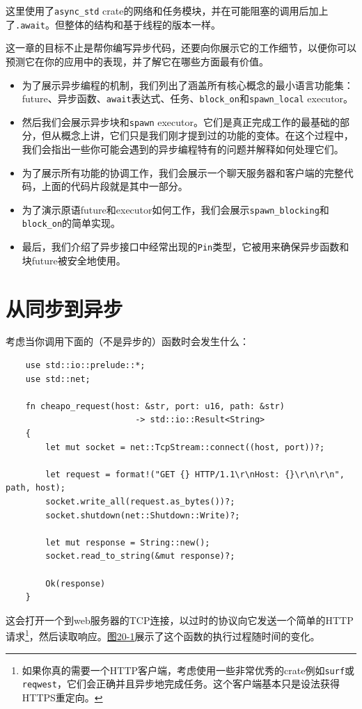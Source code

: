 这里使用了\texttt{async\_std} crate的网络和任务模块，并在可能阻塞的调用后加上了\texttt{.await}。但整体的结构和基于线程的版本一样。

这一章的目标不止是帮你编写异步代码，还要向你展示它的工作细节，以便你可以预测它在你的应用中的表现，并了解它在哪些方面最有价值。

\begin{itemize}
    \item 为了展示异步编程的机制，我们列出了涵盖所有核心概念的最小语言功能集：future、异步函数、\texttt{await}表达式、任务、\texttt{block\_on}和\texttt{spawn\_local} executor。
    \item 然后我们会展示异步块和\texttt{spawn} executor。它们是真正完成工作的最基础的部分，但从概念上讲，它们只是我们刚才提到过的功能的变体。在这个过程中，我们会指出一些你可能会遇到的异步编程特有的问题并解释如何处理它们。
    \item 为了展示所有功能的协调工作，我们会展示一个聊天服务器和客户端的完整代码，上面的代码片段就是其中一部分。
    \item 为了演示原语future和executor如何工作，我们会展示\texttt{spawn\_blocking}和\texttt{block\_on}的简单实现。
    \item 最后，我们介绍了异步接口中经常出现的\texttt{Pin}类型，它被用来确保异步函数和块future被安全地使用。
\end{itemize}

\section{从同步到异步}

考虑当你调用下面的（不是异步的）函数时会发生什么：
\begin{verbatim}
    use std::io::prelude::*;
    use std::net;

    fn cheapo_request(host: &str, port: u16, path: &str)
                          -> std::io::Result<String>
    {
        let mut socket = net::TcpStream::connect((host, port))?;

        let request = format!("GET {} HTTP/1.1\r\nHost: {}\r\n\r\n", path, host);
        socket.write_all(request.as_bytes())?;
        socket.shutdown(net::Shutdown::Write)?;

        let mut response = String::new();
        socket.read_to_string(&mut response)?;

        Ok(response)
    }
\end{verbatim}

这会打开一个到web服务器的TCP连接，以过时的协议向它发送一个简单的HTTP请求\footnote{如果你真的需要一个HTTP客户端，考虑使用一些非常优秀的crate例如\texttt{surf}或\texttt{reqwest}，它们会正确并且异步地完成任务。这个客户端基本只是设法获得HTTPS重定向。}，然后读取响应。\hyperref[f20-1]{图20-1}展示了这个函数的执行过程随时间的变化。

